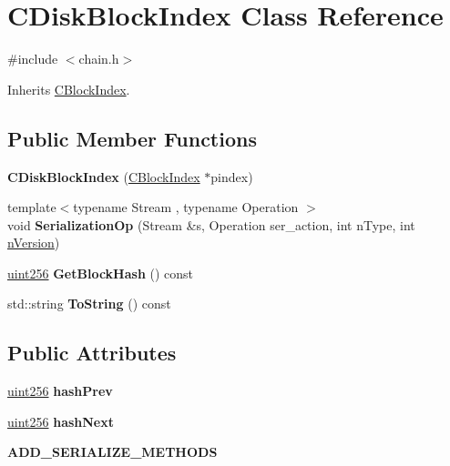 \hypertarget{class_c_disk_block_index}{}\section{C\+Disk\+Block\+Index Class Reference}
\label{class_c_disk_block_index}


{\ttfamily \#include $<$chain.\+h$>$}



Inherits \mbox{\hyperlink{class_c_block_index}{C\+Block\+Index}}.

\subsection*{Public Member Functions}
\begin{DoxyCompactItemize}
\item 
\mbox{\label{class_c_disk_block_index_a1407006c4526260b57ec2d8b3abc707d}} 
{\bfseries C\+Disk\+Block\+Index} (\mbox{\hyperlink{class_c_block_index}{C\+Block\+Index}} $\ast$pindex)
\item 
\mbox{\label{class_c_disk_block_index_a2ef7b51f2777fcc1b9625a0ee000f9b5}} 
{\footnotesize template$<$typename Stream , typename Operation $>$ }\\void {\bfseries Serialization\+Op} (Stream \&s, Operation ser\+\_\+action, int n\+Type, int \mbox{\hyperlink{class_c_block_index_a45126301a0a6e26010527a7bbfc1ef58}{n\+Version}})
\item 
\mbox{\label{class_c_disk_block_index_acc607a9082c558d7301077631b66122b}} 
\mbox{\hyperlink{classuint256}{uint256}} {\bfseries Get\+Block\+Hash} () const
\item 
\mbox{\label{class_c_disk_block_index_a347eafa0667f8641f73062b48c217d61}} 
std\+::string {\bfseries To\+String} () const
\end{DoxyCompactItemize}
\subsection*{Public Attributes}
\begin{DoxyCompactItemize}
\item 
\mbox{\label{class_c_disk_block_index_a3a1730201a8523fb947c4d4f632a4212}} 
\mbox{\hyperlink{classuint256}{uint256}} {\bfseries hash\+Prev}
\item 
\mbox{\label{class_c_disk_block_index_a0dda572f44335a5317de18001c3594a8}} 
\mbox{\hyperlink{classuint256}{uint256}} {\bfseries hash\+Next}
\item 
\mbox{\label{class_c_disk_block_index_adfa97e82f2e6db827fc6b8b5e351a1f9}} 
{\bfseries A\+D\+D\+\_\+\+S\+E\+R\+I\+A\+L\+I\+Z\+E\+\_\+\+M\+E\+T\+H\+O\+DS}
\end{DoxyCompactItemize}
